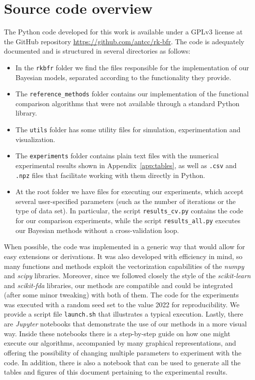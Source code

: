 \section{Source code overview}\label{app:source-code}

The Python code developed for this work is available under a GPLv3 license at the GitHub repository \url{https://github.com/antcc/rk-bfr}. The code is adequately documented and is structured in several directories as follows:

\begin{itemize}
    \item In the \texttt{rkbfr} folder we find the files responsible for the implementation of our Bayesian models, separated according to the functionality they provide.
    \item The \texttt{reference\_methods} folder contains our implementation of the functional comparison algorithms that were not available through a standard Python library.
    \item The \texttt{utils} folder has some utility files for simulation, experimentation and visualization.
    \item The \texttt{experiments} folder contains plain text files with the numerical experimental results shown in Appendix~\ref{app:tables}, as well as \texttt{.csv} and \texttt{.npz} files that facilitate working with them directly in Python.
    \item At the root folder we have files for executing our experiments, which accept several user-specified parameters (such as the number of iterations or the type of data set). In particular, the script \texttt{results\_cv.py} contains the code for our comparison experiments, while the script \texttt{results\_all.py} executes our Bayesian methods without a cross-validation loop.
  \end{itemize}

When possible, the code was implemented in a generic way that would allow for easy extensions or derivations. It was also developed with efficiency in mind, so many functions and methods exploit the vectorization capabilities of the \textit{numpy} and \textit{scipy} libraries. Moreover, since we followed closely the style of the \textit{scikit-learn} and \textit{scikit-fda} libraries, our methods are compatible and could be integrated (after some minor tweaking) with both of them. The code for the experiments was executed with a random seed set to the value 2022 for reproducibility. We provide a script file \texttt{launch.sh} that illustrates a typical execution. Lastly, there are \textit{Jupyter} notebooks that demonstrate the use of our methods in a more visual way. Inside these notebooks there is a step-by-step guide on how one might execute our algorithms, accompanied by many graphical representations, and offering the possibility of changing multiple parameters to experiment with the code. In addition, there is also a notebook that can be used to generate all the tables and figures of this document pertaining to the experimental results.


